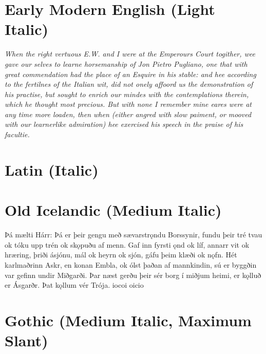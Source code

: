 \documentclass[12pt,letterpaper,openany]{book}
\begin{document}
\section{Early Modern English (Light Italic)}

\textit{\large\itallight{}When the right vertuous E.W. and I were at the Emperours Court to\-gither, wee gave our selves to learne horsemanship of Jon Pietro Pugliano, one that with great commendation had the place of an Esquire in his stable: and hee according to the fertilnes of the Italian wit, did not onely affoord us the demonstration of his practise, but sought to enrich our \mbox{mindes} with the contemplations therein, which he thought most precious. But with none I remember mine eares were at any time more loaden, then when (either angred with slow paiment, or mooved with our learnerlike admiration) hee exercised his speech in the praise of his facultie.}

\section{Latin (Italic)}

\textit{\large{}}

\section{Old Icelandic (Medium Italic)}

{\italmedium\large Þá mælti Hárr: Þá er þeir gengu með sævarstrǫndu Borssynir, fundu þeir tré tvau ok tóku upp trén ok skǫpuðu af menn. Gaf inn fyrsti ǫnd ok líf, annarr vit ok hræring, þriði ásjónu, mál ok heyrn ok sjón, gáfu þeim klæði ok nǫfn. Hét karlmaðrinn Askr, en konan Embla, ok ólst þaðan af mannkindin, sú er byggðin var gefinn undir Miðgarði. Þar næst gerðu þeir sér borg í miðjum heimi, er kǫlluð er Ásgarðr. Þat kǫllum vér Trója. iocoi oicio}

\section{Gothic (Medium Italic, Maximum Slant)}
\end{document}
